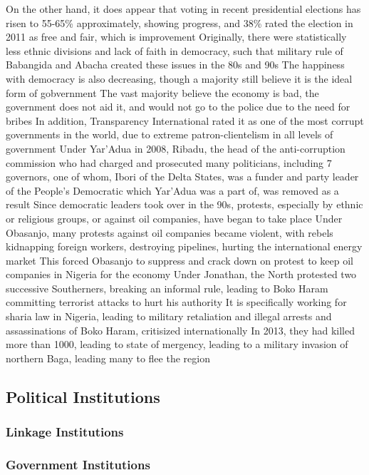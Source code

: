 \documentclass[11 pt, twoside]{article}
\newenvironment{outline*}
{
	\begin{outline}[enumerate]
	}
	{\end{outline}
}
\begin{document}
\begin{outline*}
\3 On the other hand, it does appear that voting in recent presidential elections has risen to 55-65\% approximately, showing progress, and 38\% rated the election in 2011 as free and fair, which is improvement
\3 Originally, there were statistically less ethnic divisions and lack of faith in democracy, such that military rule of Babangida and Abacha created these issues in the 80s and 90s
\4 The happiness with democracy is also decreasing, though a majority still believe it is the ideal form of gobvernment
\3 The vast majority believe the economy is bad, the government does not aid it, and would not go to the police due to the need for bribes
\3 In addition, Transparency International rated it as one of the most corrupt governments in the world, due to extreme patron-clientelism in all levels of government
\4 Under Yar'Adua in 2008, Ribadu, the head of the anti-corruption commission who had charged and prosecuted many politicians, including 7 governors, one of whom, Ibori of the Delta States, was a funder and party leader of the People's Democratic which Yar'Adua was a part of, was removed as a result
\2 Since democratic leaders took over in the 90s, protests, especially by ethnic or religious groups, or against oil companies, have began to take place
\3 Under Obasanjo, many protests against oil companies became violent, with rebels kidnapping foreign workers, destroying pipelines, hurting the international energy market
\4 This forced Obasanjo to suppress and crack down on protest to keep oil companies in Nigeria for the economy
\3 Under Jonathan, the North protested two successive Southerners, breaking an informal rule, leading to Boko Haram committing terrorist attacks to hurt his authority
\4 It is specifically working for sharia law in Nigeria, leading to military retaliation and illegal arrests and assassinations of Boko Haram, critisized internationally
\4 In 2013, they had killed more than 1000, leading to state of mergency, leading to a military invasion of northern Baga, leading many to flee the region
\subsection{Political Institutions}
\subsubsection{Linkage Institutions}
\begin{outline*}

\end{outline*}
\subsubsection{Government Institutions}
\begin{outline*}


\end{outline*}
\end{outline*}
\end{document}
